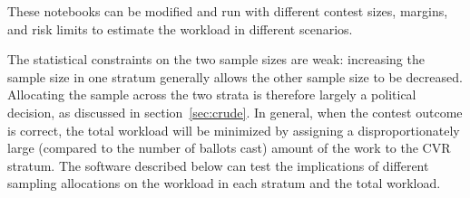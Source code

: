 \documentclass[runningheads]{llncs}
\begin{document}
These notebooks can be modified and run with different contest sizes, margins, and risk limits to
estimate the workload in different scenarios.

The statistical constraints on the two sample sizes are weak: increasing the
sample size in one stratum generally allows the other sample size to be decreased.
Allocating the sample across the two strata is therefore largely a political decision,
as discussed in section~\ref{sec:crude}.
In general, when the contest outcome is correct, the total workload will be minimized by 
assigning a disproportionately large (compared to the number of ballots cast) amount of 
the work to the CVR stratum.
The software described below can test the implications of different sampling allocations
on the workload in each stratum and the total workload.



\end{document}

